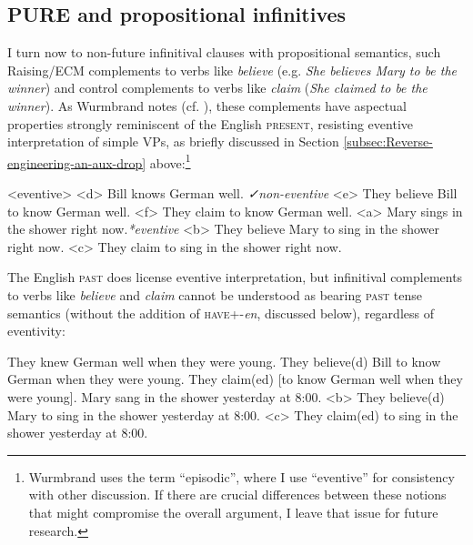 \documentclass[output=paper]{langscibook}
\begin{document}
\subsection{PURE and propositional infinitives}\largerpage

I turn now to non-future infinitival clauses with propositional semantics, such Raising/ECM complements to verbs like \textit{believe} (e.g. \textit{She believes Mary to be the winner}) and control complements to verbs like \textit{claim} (\textit{She claimed to be the winner}). As Wurmbrand notes (cf. \citealt{Pesetsky1991}), these complements have aspectual properties strongly reminiscent of the English \textsc{present}, resisting eventive interpretation of simple VPs, as briefly discussed in Section \ref{subsec:Reverse-engineering-an-aux-drop} above:\footnote{Wurmbrand uses the term “episodic”, where I use “eventive” for consistency with other discussion. If there are crucial differences between these notions that might compromise the overall argument, I leave that issue for future research.}

\pex<eventive>
\a<d> Bill knows German well. \tabto{3in}\textit{✓non-eventive}
\a<e> They believe Bill to know German well. 
\a<f> They claim to know German well.
\vspace{.5\baselineskip}
\a[label=d]<a> \ljudge*Mary sings in the shower right now.\tabto{3in}\textit{*eventive}
\a[label=e]<b> \ljudge*They believe Mary to sing in the shower right now.
\a[label=f]<c> \ljudge*They claim to sing in the shower right now.
\xe

\noindent The English \textsc{past} does license eventive interpretation, but infinitival complements to verbs like \textit{believe} and \textit{claim} cannot be understood as bearing \textsc{past} tense semantics (without the addition of \textsc{have}+-\textit{en}, discussed below), regardless of eventivity:

\a They knew German well when they were young.
\a \ljudge*They believe(d) Bill to know German when they were young.
\a \ljudge*They claim(ed) [to know German well when they were young].
\vspace{.5\baselineskip}
\a Mary sang in the shower yesterday at 8:00.
\a<b> \ljudge*They believe(d) Mary to sing in the shower yesterday at 8:00.
\a<c> \ljudge*They claim(ed) to sing in the shower yesterday at 8:00.
\xe
\end{document}
